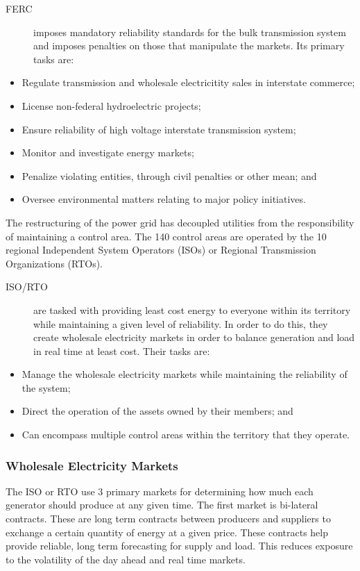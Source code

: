 \begin{description}
\item[FERC] imposes mandatory reliability standards for the bulk transmission system and imposes penalties on those that manipulate the markets.  Its primary tasks are:
\end{description}
\begin{itemize}
\item Regulate transmission and wholesale electricitity sales in interstate commerce;
\item License non-federal hydroelectric projects;
\item Ensure reliability of high voltage interstate transmission system;
\item Monitor and investigate energy markets;
\item Penalize violating entities, through civil penalties or other mean; and
\item Oversee environmental matters relating to major policy initiatives.
\end{itemize}

The restructuring of the power grid has decoupled utilities from the responsibility of maintaining a control area.  The 140 control areas are operated by the 10 regional Independent System Operators (ISOs) or Regional Transmission Organizations (RTOs).  
\begin{description}
\item[ISO/RTO] are tasked with providing least cost energy to everyone within its territory while maintaining a given level of reliability.  In order to do this, they create wholesale electricity markets in order to balance generation and load in real time at least cost.  Their tasks are:
\end{description}
\begin{itemize}
\item Manage the wholesale electricity markets while maintaining the reliability of the system; 
\item Direct the operation of the assets owned by their members; and
\item Can encompass multiple control areas within the territory that they operate.
\end{itemize}

\subsubsection{Wholesale Electricity Markets}
The ISO or RTO use 3 primary markets for determining how much each generator should produce at any given time.  The first market is bi-lateral contracts.  These are long term contracts between producers and suppliers to exchange a certain quantity of energy at a given price.  These contracts help provide reliable, long term forecasting for supply and load. This reduces exposure to the volatility of the day ahead and real time markets.  

